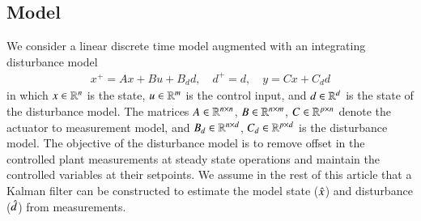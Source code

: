 \documentclass[preprint,5p, twocolumn, authoryear]{elsarticle}
\begin{document}
\subsection{Model}
We consider a linear discrete time model augmented with an 
integrating disturbance model \citep{pannocchia:rawlings:2003}
\begin{align}\label{eq:ltimodel}
    x^+ = Ax + Bu + B_dd, \quad d^+ = d, \quad y = Cx + C_dd
\end{align}
in which $x \in \mathbb{R}^n$ is the state, 
$u \in \mathbb{R}^m$ is the control input, and
$d \in \mathbb{R}^d$ is the state of the disturbance
model. The matrices $A \in \mathbb{R}^{n \times n}$, 
$B \in \mathbb{R}^{n \times m}$,  
$C \in \mathbb{R}^{p \times n}$ denote the actuator to measurement 
model, and $B_d \in \mathbb{R}^{n \times d}$, $C_d \in \mathbb{R}^{p \times d}$
is the disturbance model.
The objective of the disturbance model
is to remove offset in the controlled 
plant measurements at steady
state operations and maintain
the controlled variables at their setpoints.
We assume in the rest of this 
article that a Kalman filter can be constructed to 
estimate the model state ($\hat{x}$) and disturbance ($\hat{d}$) 
from measurements. 
\end{document}
